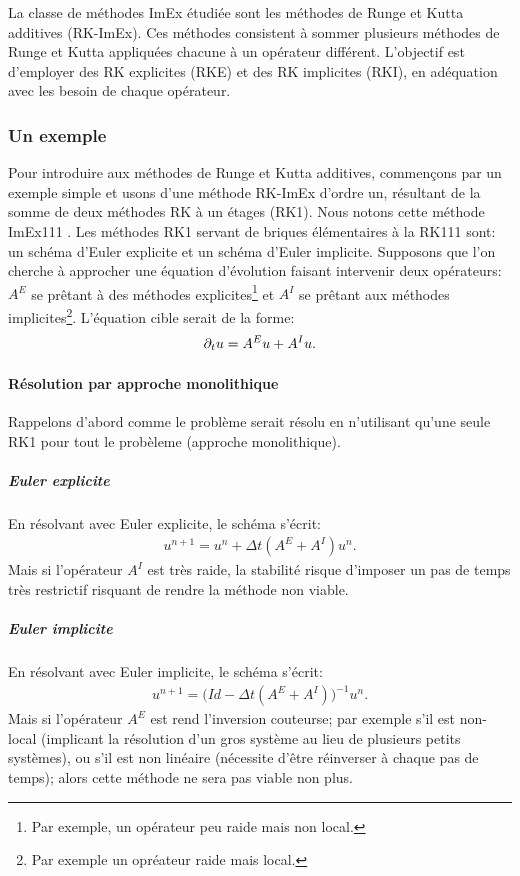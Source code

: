 La classe de méthodes ImEx étudiée sont les méthodes de Runge et Kutta additives (RK-ImEx).
Ces méthodes consistent à sommer plusieurs méthodes de Runge et Kutta appliquées chacune à un opérateur différent.
L'objectif est d'employer des RK explicites (RKE) et des RK implicites (RKI), en adéquation avec les besoin de chaque opérateur.
\subsubsection{Un exemple}
    Pour introduire aux méthodes de Runge et Kutta additives, commençons par un exemple simple et usons d'une méthode RK-ImEx
    d'ordre un, résultant de la somme de deux méthodes RK à un étages (RK1). Nous notons cette méthode ImEx111 \cite{ASCHER1997151}. 
    Les méthodes RK1 servant de briques élémentaires à la RK111 sont: un schéma d'Euler explicite et un schéma d'Euler implicite.
    Supposons que l'on cherche à approcher une équation d'évolution faisant intervenir deux opérateurs: $A^E$ se prêtant à des méthodes explicites\footnote{Par exemple, un opérateur peu raide mais non local.}
    et $A^I$ se prêtant aux méthodes implicites\footnote{Par exemple un opréateur raide mais local.}. L'équation cible serait de la forme: 
    \begin{align}
        \partial_t u = A^E u + A^I u.
    \end{align}
    \paragraph{Résolution par approche monolithique}
        Rappelons d'abord comme le problème serait résolu en n'utilisant qu'une seule RK1 pour tout le probèleme (approche monolithique).
        \subparagraph{Euler explicite}
            En résolvant avec Euler explicite, le schéma s'écrit: 
            \begin{align}
                u^{n+1} = u^n + \Delta t (A^E + A^I) u^n.
            \end{align}
            Mais si l'opérateur $A^I$ est très raide, la stabilité risque d'imposer un pas de temps très restrictif risquant de rendre la méthode non viable.
        \subparagraph{Euler implicite}
            En résolvant avec Euler implicite, le schéma s'écrit:
            \begin{align}
                u^{n+1} = \bigl(Id - \Delta t (A^E + A^I)\bigr)^{-1} u^n.
            \end{align}
            Mais si l'opérateur $A^E$ est rend l'inversion couteurse;
            par exemple s'il est non-local (implicant la résolution d'un gros système au lieu de plusieurs petits systèmes), 
            ou s'il est non linéaire (nécessite d'être réinverser à chaque pas de temps);
            alors cette méthode ne sera pas viable non plus.
